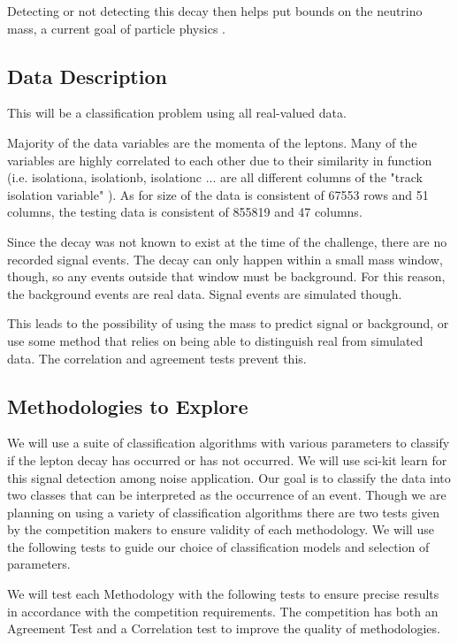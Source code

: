 \documentclass{article} %
\begin{document}
Detecting or not detecting this decay then helps put bounds on the neutrino mass, a current goal of particle physics \cite{lhcb15}.

\subsection*{Data Description}

This will be a classification problem using all real-valued data.

Majority of the data variables are the momenta of the leptons. Many of the variables are highly correlated to each other due to their similarity in function (i.e. isolationa, isolationb, isolationc ... are all different columns of the "track isolation variable" \cite{kaggleComp}). As for size of the data is consistent of 67553 rows and 51 columns, the testing data is consistent of 855819 and 47 columns. 

Since the decay was not known to exist at the time of the challenge, there are no recorded signal events. The decay can only happen within a small mass window, though, so any events outside that window must be background. For this reason, the background events are real data. Signal events are simulated though. 

This leads to the possibility of using the mass to predict signal or background, or use some method that relies on being able to distinguish real from simulated data. The correlation and agreement tests prevent this.

\subsection*{Methodologies to Explore}
We will use a suite of classification algorithms with various parameters to classify if the lepton decay has occurred or has not occurred. We will use sci-kit learn for this signal detection among noise application. Our goal is  to classify the data into two classes that can be interpreted as the occurrence of an event. Though we are planning on using a variety of classification algorithms there are two tests given by the competition makers to ensure validity of each methodology. We will use the following tests to guide our choice of classification models and selection of  parameters.

We will test each Methodology with the following tests to ensure precise results in accordance with the competition requirements. The competition has both an Agreement Test and a Correlation test to improve the quality of methodologies.
\end{document}
